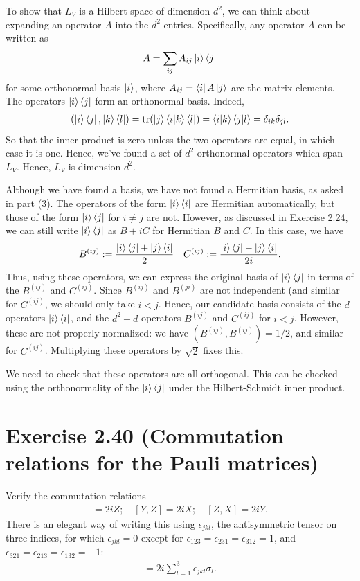 \documentclass{book}
\begin{document}
    To show that $L_V$ is a Hilbert space of dimension $d^2$, we can think about expanding an operator $A$ into the $d^2$ entries. Specifically, any operator $A$ can be written as 
    \begin{align}
        A = \sum_{ij} A_{ij} \ket{i}\bra{j}
    \end{align}
    for some orthonormal basis $\ket{i}$, where $A_{ij} = \bra{i}A\ket{j}$ are the matrix elements. The operators $\ket{i}\bra{j}$ form an orthonormal basis. Indeed,
    \begin{align}
        (\ket{i}\bra{j}, \ket{k}\bra{l}) = \tr(\ket{j}\bra{i}\ket{k}\bra{l}) = \braket{i}{k} \braket{j}{l} = \delta_{ik}\delta_{jl}.
    \end{align}
    So that the inner product is zero unless the two operators are equal, in which case it is one. Hence, we've found a set of $d^2$ orthonormal operators which span $L_V$. Hence, $L_V$ is dimension $d^2$.
    
    Although we have found a basis, we have not found a Hermitian basis, as asked in part (3). The operators of the form $\ket{i}\bra{i}$ are Hermitian automatically, but those of the form $\ket{i}\bra{j}$ for $i\neq j$ are not. However, as discussed in Exercise 2.24, we can still write $\ket{i}\bra{j}$ as $B + iC$ for Hermitian $B$ and $C$. In this case, we have
    \begin{align} \label{eq:B_C_Hermitian}
        B^{(ij)} := \frac{\ket{i}\bra{j}+\ket{j}\bra{i}}{2} \quad  C^{(ij)} := \frac{\ket{i}\bra{j}-\ket{j}\bra{i}}{2i}.
    \end{align}
    Thus, using these operators, we can express the original basis of $\ket{i}\bra{j}$ in terms of the $B^{(ij)}$ and $C^{(ij)}$. Since $B^{(ij)}$ and $B^{(ji)}$ are not independent (and similar for $C^{(ij)}$, we should only take $i <j$. Hence, our candidate basis consists of the $d$ operators $\ket{i}\bra{i}$, and the $d^2 - d$ operators $B^{(ij)}$ and $C^{(ij)}$ for $i < j$. However, these are not properly normalized: we have $(B^{(ij)}, B^{(ij)}) = 1/2$, and similar for $C^{(ij)}$. Multiplying these operators by $\sqrt{2}$ fixes this.
    
    We need to check that these operators are all orthogonal. This can be checked using the orthonormality of the $\ket{i}\bra{j}$ under the Hilbert-Schmidt inner product. 
    
\section*{Exercise 2.40 (Commutation relations for the Pauli matrices)}
    Verify the commutation relations
    \begin{align}
        [X, Y] = 2iZ; \quad [Y, Z] = 2iX; \quad [Z, X] = 2iY.
    \end{align}
    There is an elegant way of writing this using $\epsilon_{jkl}$, the antisymmetric tensor on three indices, for which $\epsilon_{jkl} = 0$ except for $\epsilon_{123} = \epsilon_{231} = \epsilon_{312} = 1$, and $\epsilon_{321} = \epsilon_{213} = \epsilon_{132} = -1$:
    \begin{align}
        [\sigma_j, \sigma_k] = 2i \sum_{l=1}^3 \epsilon_{jkl} \sigma_l.
    \end{align}
    
\end{document}
